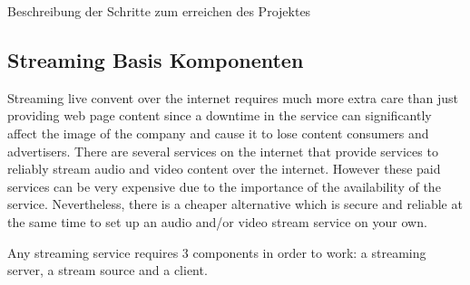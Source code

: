 Beschreibung der Schritte zum erreichen des Projektes


\subsection{Streaming Basis Komponenten}
Streaming live convent over the internet requires much more extra care than just providing web page content since a downtime in the service can significantly affect the image of the company and cause it to lose content consumers and advertisers. There are several services on the internet that provide services to reliably stream audio and video content over the internet. However these paid services can be very expensive due to the importance of the availability of the service. Nevertheless, there is a cheaper alternative which is secure and reliable at the same time to set up an audio and/or video stream service on your own.

Any streaming service requires 3 components in order to work: a streaming server, a stream source and a client.

